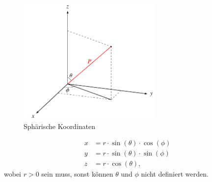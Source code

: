 \begin{figure}
	\centering
	\includegraphics[width=200pt]{papers/spektral/images/spherical_coordinates.pdf}
	\caption{Sphärische Koordinaten}
    \label{spektral:fig:sphericalcoords}
\end{figure}
\pagebreak

\begin{align}
x &= r\cdot\sin(\theta)\cdot\cos(\phi)
\label{spektral:equation4}
\\
 y &= r\cdot\sin(\theta)\cdot\sin(\phi)
\label{spektral:equation5}
\\
 z &= r\cdot\cos(\theta),
\label{spektral:equation6}
\end{align}
wobei $r > 0$ sein muss, sonst können $\theta$ und $\phi$ nicht definiert werden.


